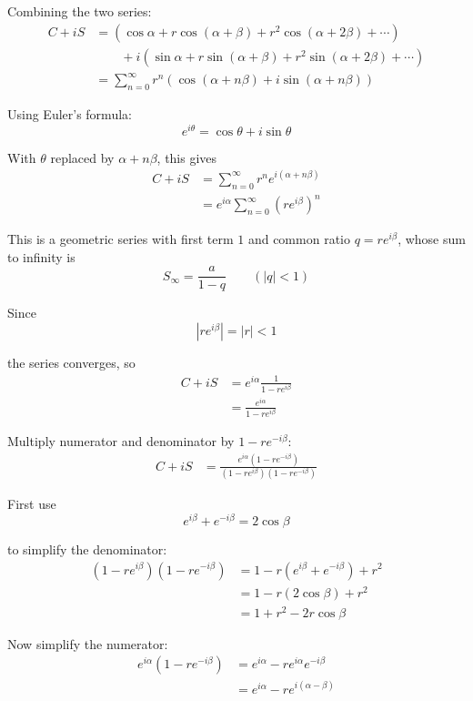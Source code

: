 \documentclass[leqno]{article}
\begin{document}
\begin{enumerate}[
  label=\textbf{\arabic*.},
  leftmargin=*,
  topsep=0pt,
  partopsep=0pt,
  parsep=0pt
]
\begin{djsSolution}
Combining the two series:
\begin{align*}
C+iS&=\left(\cos\alpha+r\cos(\alpha+\beta)+r^2\cos(\alpha+2\beta)+\cdots\right) \\
&\qquad +i\left(\sin\alpha+r\sin(\alpha+\beta)+r^2\sin(\alpha+2\beta)+\cdots\right) \\
&=\sum_{n=0}^{\infty} r^n\left(\cos(\alpha+n\beta)+i\sin(\alpha+n\beta)\right)
\end{align*}

Using Euler's formula:
\[
e^{i\theta}=\cos\theta+i\sin\theta
\]

With \(\theta\) replaced by \(\alpha+n\beta\), this gives
\begin{align*}
C+iS&=\sum_{n=0}^{\infty} r^n e^{i(\alpha+n\beta)} \\
&=e^{i\alpha}\sum_{n=0}^{\infty}\left(re^{i\beta}\right)^n
\end{align*}

This is a geometric series with first term \(1\) and common ratio \(q=re^{i\beta}\), whose sum to infinity is
\[
S_\infty=\dfrac{a}{1-q}\qquad(|q|<1)
\]

Since
\[
\left|re^{i\beta}\right|=|r|<1
\]

the series converges, so
\begin{align*}
C+iS&=e^{i\alpha}\frac{1}{1-re^{i\beta}} \\
&=\frac{e^{i\alpha}}{1-re^{i\beta}}
\end{align*}

Multiply numerator and denominator by \(1-re^{-i\beta}\):
\begin{align*}
C+iS&=\frac{e^{i\alpha}(1-re^{-i\beta})}{(1-re^{i\beta})(1-re^{-i\beta})}
\end{align*}

First use
\[
e^{i\beta}+e^{-i\beta}=2\cos\beta
\]

to simplify the denominator:
\begin{align*}
(1-re^{i\beta})(1-re^{-i\beta})
&=1-r(e^{i\beta}+e^{-i\beta})+r^2 \\
&=1-r(2\cos\beta)+r^2 \\
&=1+r^2-2r\cos\beta
\end{align*}

Now simplify the numerator:
\begin{align*}
e^{i\alpha}(1-re^{-i\beta})
&=e^{i\alpha}-re^{i\alpha}e^{-i\beta} \\
&=e^{i\alpha}-re^{i(\alpha-\beta)}
\end{align*}


\end{djsSolution}
\end{enumerate}
\end{document}
